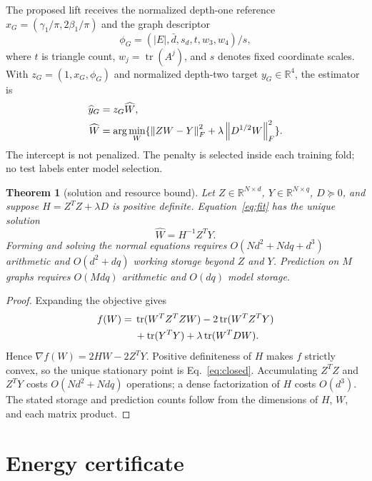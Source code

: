 \documentclass[10pt,letterpaper,twoside]{article}
\newtheorem{theorem}{Theorem}
\newcommand{\R}{\mathbb{R}}
\newcommand{\norm}[1]{\left\lVert #1\right\rVert}
\begin{document}
The proposed lift receives the normalized depth-one reference
$x_G=(\gamma_1/\pi,2\beta_1/\pi)$ and the graph descriptor
\begin{equation}
 \phi_G=(|E|,\bar d,s_d,t,w_3,w_4)/s,
\end{equation}
where $t$ is triangle count, $w_j=\operatorname{tr}(A^j)$, and $s$ denotes
fixed coordinate scales.  With
$z_G=(1,x_G,\phi_G)$ and normalized depth-two target
$y_G\in\R^4$, the estimator is
\begin{align}
 \widehat y_G&=z_G\widehat W,\notag\\
 \widehat W&=\arg\min_W
 \{\norm{ZW-Y}_F^2+\lambda\norm{D^{1/2}W}_F^2\}. \label{eq:fit}
\end{align}
The intercept is not penalized.  The penalty is selected inside each training
fold; no test labels enter model selection.

\begin{theorem}[solution and resource bound]
\label{thm:fit}
Let $Z\in\R^{N\times d}$, $Y\in\R^{N\times q}$, $D\succeq0$, and suppose
$H=Z^TZ+\lambda D$ is positive definite.  Equation~\eqref{eq:fit} has the
unique solution
\begin{equation}
 \widehat W=H^{-1}Z^TY.                              \label{eq:closed}
\end{equation}
Forming and solving the normal equations requires
$O(Nd^2+Ndq+d^3)$ arithmetic and $O(d^2+dq)$ working storage beyond $Z$ and
$Y$.  Prediction on $M$ graphs requires $O(Mdq)$ arithmetic and $O(dq)$ model
storage.
\end{theorem}

\begin{proof}
Expanding the objective gives
\begin{align}
 f(W)={}&\operatorname{tr}(W^TZ^TZW)-2\operatorname{tr}(W^TZ^TY)\notag\\
       &+\operatorname{tr}(Y^TY)+\lambda\operatorname{tr}(W^TDW).
\end{align}
Hence $\nabla f(W)=2HW-2Z^TY$.  Positive definiteness of $H$ makes $f$
strictly convex, so the unique stationary point is Eq.~\eqref{eq:closed}.
Accumulating $Z^TZ$ and $Z^TY$ costs $O(Nd^2+Ndq)$ operations; a dense
factorization of $H$ costs $O(d^3)$.  The stated storage and prediction counts
follow from the dimensions of $H$, $W$, and each matrix product.
\end{proof}

\section{Energy certificate}
\end{document}
